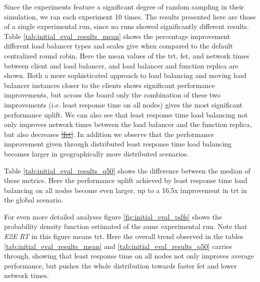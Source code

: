\documentclass[draft,final]{vutinfth} %
\providecommand{\DIFaddtex}[1]{{\protect\color{blue}\uwave{#1}}} %
\providecommand{\DIFdeltex}[1]{{\protect\color{red}\sout{#1}}}                      %
\providecommand{\DIFaddbegin}{} %
\providecommand{\DIFaddend}{} %
\providecommand{\DIFdelbegin}{} %
\providecommand{\DIFdelend}{} %
\providecommand{\DIFadd}[1]{\texorpdfstring{\DIFaddtex{#1}}{#1}} %
\providecommand{\DIFdel}[1]{\texorpdfstring{\DIFdeltex{#1}}{}} %
\begin{document}
\DIFdelend Since the experiments feature a significant degree of random sampling in their simulation, we ran each experiment 10 times.
The results presented here are those of a single experimental run, since no runs showed significantly different results.
Table \ref{tab:initial_eval_results_mean} shows the percentage improvement different load balancer types and scales give when compared to the default centralized round robin.
Here the mean values of the \gls{trt}, \gls{fet}, and network times between client and load balancer, and load balancer and function replica are shown.
Both a more sophisticated approach to load balancing and moving load balancer instances closer to the clients shows significant performance improvements, but across the board only the combination of these two improvements (i.e. least response time on all nodes) gives the most significant performance uplift.
We can also see that least response time load balancing not only improves network times between the load balancer and the function replica, but also decreases \DIFdelbegin \DIFdel{\ref{fet}}\DIFdelend \DIFaddbegin \DIFadd{\mbox{%
\gls{fet}}\hskip0pt%
}\DIFaddend .
In addition we observe that the performance improvement given through distributed least response time load balancing becomes larger in geographically more distributed scenarios.

Table \ref{tab:initial_eval_results_q50} shows the difference between the median of these metrics.
Here the performance uplift achieved by least response time load balancing on all nodes become even larger, up to a 16,5x improvement in \gls{trt} in the global scenario.

For even more detailed analyses figure \ref{fig:initial_eval_pdfs} shows the probability density function estimated of the same experimental run.
Note that \textit{E2E RT} in this figure means \gls{trt}.
Here the overall trend observed in the tables \ref{tab:initial_eval_results_mean} and \ref{tab:initial_eval_results_q50} carries through, showing that least response time on all nodes not only improves average performance, but pushes the whole distribution towards faster \gls{fet} and lower network times.
\DIFdelbegin %
\DIFdelend \DIFaddbegin 
\end{document}
